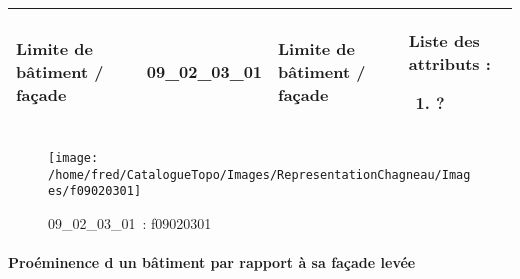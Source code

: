 \documentclass[12pt,titlepage]{book}
\begin{document}
\renewcommand{\arraystretch}{1.2}
\begin{supertabular}{|p{10cm}|c|p{13cm}|p{12cm}|}
 Limite de bâtiment / façade & 09\_02\_03\_01 & Limite de bâtiment / façade & Liste des attributs :
\begin{enumerate}
  \item ?\end{enumerate}
\\
\hline
\end{supertabular}
\begin{figure}[h!]
  \hfill         %
  \begin{minipage}[t]{3cm}
    \begin{center}
      \texttt{[image: /home/fred/CatalogueTopo/Images/RepresentationChagneau/Images/f09020301]}
      \caption[~09\_02\_03\_01]{\small{09\_02\_03\_01~:} \tiny{f09020301}}\label{f09020301}
    \end{center}
  \end{minipage}
\end{figure}


\paragraph{Proéminence d un bâtiment par rapport à sa façade levée}
\noindent
\vspace{\baselineskip}
\end{document}
